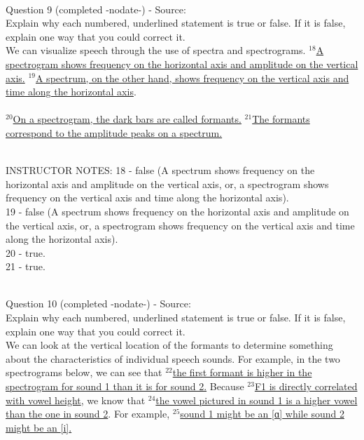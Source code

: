 \documentclass[12pt]{article}
\begin{document}
~\\

{\large Question 9} (completed -nodate-) - Source: \\

Explain why each numbered, underlined statement is true or false. If it is false, explain one way that you could correct it.\\

We can visualize speech through the use of spectra and spectrograms. $^{18}$\ul{A spectrogram shows frequency on the horizontal axis and amplitude on the vertical axis.} $^{19}$\ul{A spectrum, on the other hand, shows frequency on the vertical axis and time along the horizontal axis}.\\\\$^{20}$\ul{On a spectrogram, the dark bars are called formants.} $^{21}$\ul{The formants correspond to the amplitude peaks on a spectrum.}


~\\
INSTRUCTOR NOTES: 18 - false (A spectrum shows frequency on the horizontal axis and amplitude on the vertical axis, or, a spectrogram shows frequency on the vertical axis and time along the horizontal axis).\\19 - false (A spectrum shows frequency on the horizontal axis and amplitude on the vertical axis, or, a spectrogram shows frequency on the vertical axis and time along the horizontal axis).\\20 - true.\\21 - true.


~\\

{\large Question 10} (completed -nodate-) - Source: \\

Explain why each numbered, underlined statement is true or false. If it is false, explain one way that you could correct it.\\

We can look at the vertical location of the formants to determine something about the characteristics of individual speech sounds. For example, in the two spectrograms below, we can see that $^{22}$\ul{the first formant is higher in the spectrogram for sound 1 than it is for sound 2.} Because $^{23}$\ul{F1 is directly correlated with vowel height}, we know that $^{24}$\ul{the vowel pictured in sound 1 is a higher vowel than the one in sound 2}. For example, $^{25}$\ul{sound 1 might be an {[ɑ]} while sound 2 might be an {[i]}.}
\end{document}

